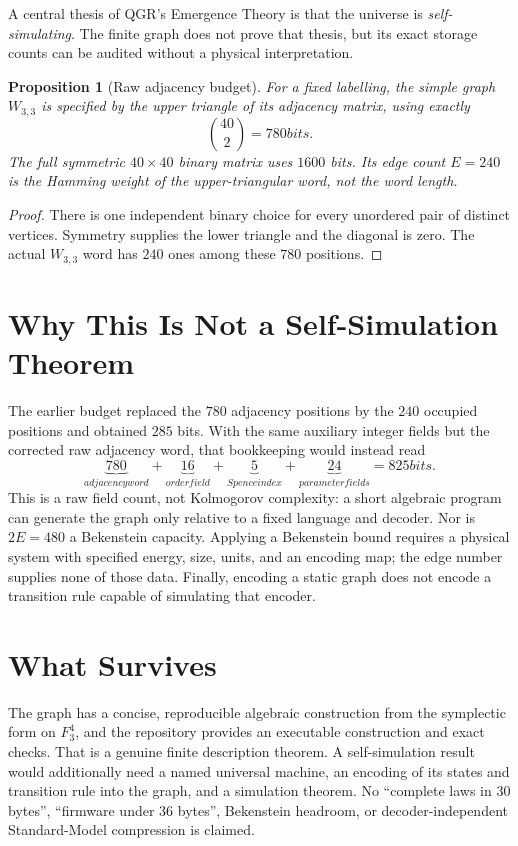\documentclass[12pt,a4paper]{article}
\def\mathbb#1{#1}%
\def\text#1{#1}%
\newtheorem{proposition}[theorem]{Proposition}
\theoremstyle{definition}
\begin{document}
A central thesis of QGR's Emergence Theory is that the universe is
\emph{self-simulating}.  The finite graph does not prove that thesis,
but its exact storage counts can be audited without a physical
interpretation.

\begin{proposition}[Raw adjacency budget]
\label{thm:self-sim}
For a fixed labelling, the simple graph $W_{3,3}$ is specified by the
upper triangle of its adjacency matrix, using exactly
\[
\binom{40}{2}=780\text{ bits}.
\]
The full symmetric $40\times40$ binary matrix uses $1600$ bits.  Its
edge count $E=240$ is the Hamming weight of the upper-triangular
word, not the word length.
\end{proposition}

\begin{proof}
There is one independent binary choice for every unordered pair of
distinct vertices.  Symmetry supplies the lower triangle and the
diagonal is zero.  The actual $W_{3,3}$ word has $240$ ones among
these $780$ positions.
\end{proof}

\section*{Why This Is Not a Self-Simulation Theorem}

The earlier budget replaced the $780$ adjacency positions by the $240$
occupied positions and obtained $285$ bits.  With the same auxiliary
integer fields but the corrected raw adjacency word, that bookkeeping
would instead read
\[
\underbrace{780}_{\text{adjacency word}}+
\underbrace{16}_{\text{order field}}+
\underbrace{5}_{\text{Spence index}}+
\underbrace{24}_{\text{parameter fields}}
=825\text{ bits}.
\]
This is a raw field count, not Kolmogorov complexity: a short algebraic
program can generate the graph only relative to a fixed language and
decoder.  Nor is $2E=480$ a Bekenstein capacity.  Applying a Bekenstein
bound requires a physical system with specified energy, size, units, and
an encoding map; the edge number supplies none of those data.  Finally,
encoding a static graph does not encode a transition rule capable of
simulating that encoder.

\section*{What Survives}

The graph has a concise, reproducible algebraic construction from the
symplectic form on $\mathbb F_3^4$, and the repository provides an
executable construction and exact checks.  That is a genuine finite
description theorem.  A self-simulation result would additionally need
a named universal machine, an encoding of its states and transition
rule into the graph, and a simulation theorem.  No ``complete laws in
30 bytes'', ``firmware under 36 bytes'', Bekenstein headroom, or
decoder-independent Standard-Model compression is claimed.
\end{document}
